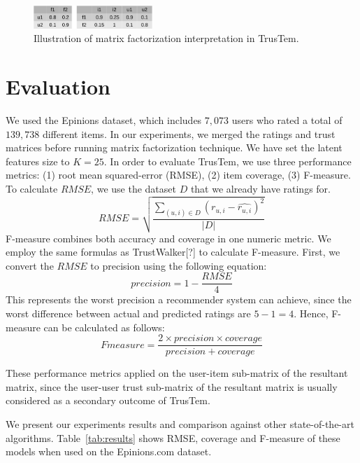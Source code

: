 \documentclass[11pt, conference, onecolumn]{IEEEtran}
\begin{document}
\begin{figure}[tp]
\centering
\includegraphics[width=0.4\textwidth]{example}
\caption{Illustration of matrix factorization interpretation in TrusTem.}
\label{fig:mf_example}
\end{figure}

\section{Evaluation}
We used the Epinions dataset, which includes $7,073$ users who rated a total of $139,738$ different items. In our experiments, we merged the ratings and trust matrices before running matrix factorization technique. We have set the latent features size to $K = 25$. In order to evaluate TrusTem, we use three performance metrics: (1) root mean squared-error (RMSE), (2) item coverage, (3) F-measure.
To calculate $RMSE$, we use the dataset $D$ that we already have ratings for.
\begin{equation}
RMSE = \sqrt{\frac{\sum_{(u,i)\in D}\left(r_{u,i} - \widehat{r_{u,i}} \right)^2}{|D|}}
\end{equation}
F-measure combines both accuracy and coverage in one numeric metric. We employ the same formulas as TrustWalker[?] to calculate F-measure. First, we convert the $RMSE$ to precision using the following equation:
\begin{equation}
precision = 1 - \frac{RMSE}{4}
\end{equation}
This represents the worst precision a recommender system can achieve, since the worst difference between actual and predicted ratings are $5-1 = 4$. Hence, F-measure can be calculated as follows:
\begin{equation}
Fmeasure = \frac{2\times precision \times coverage}{precision + coverage}
\end{equation}

These performance metrics applied on the user-item sub-matrix of the resultant matrix, since the user-user trust sub-matrix of the resultant matrix is usually considered as a secondary outcome of TrusTem.

We present our experiments results and comparison against other state-of-the-art algorithms. Table~\ref{tab:results} shows RMSE, coverage and F-measure of these models when used on the Epinions.com dataset. 
\end{document}

